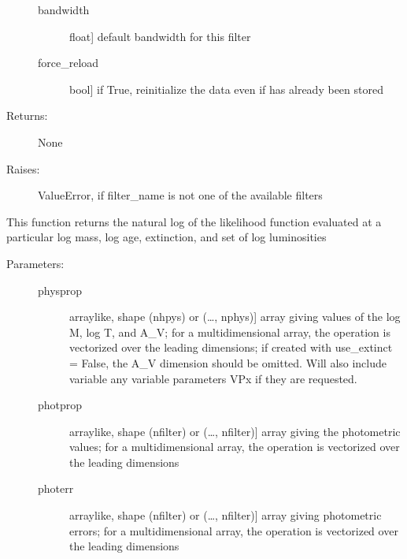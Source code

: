 \documentclass[letterpaper,10pt,english]{sphinxmanual}
\begin{document}
\begin{fulllineitems}
\begin{fulllineitems}
\begin{description}
\begin{description}
\item[{bandwidth}] \leavevmode{[}float{]}
default bandwidth for this filter

\item[{force\_reload}] \leavevmode{[}bool{]}
if True, reinitialize the data even if has already been
stored

\end{description}

\item[{Returns:}] \leavevmode
None

\item[{Raises:}] \leavevmode
ValueError, if filter\_name is not one of the available
filters

\end{description}

\end{fulllineitems}


\begin{fulllineitems}
\label{\detokenize{cluster_slug:slugpy.cluster_slug.cluster_slug.logL}}
This function returns the natural log of the likelihood
function evaluated at a particular log mass, log age,
extinction, and set of log luminosities
\begin{description}
\item[{Parameters:}] \leavevmode\begin{description}
\item[{physprop}] \leavevmode{[}arraylike, shape (nhpys) or (…, nphys){]}
array giving values of the log M, log T, and A\_V; for a
multidimensional array, the operation is vectorized over
the leading dimensions; if created with use\_extinct =
False, the A\_V dimension should be omitted.
Will also include variable any variable parameters VPx if
they are requested.

\item[{photprop}] \leavevmode{[}arraylike, shape (nfilter) or (…, nfilter){]}
array giving the photometric values; for a
multidimensional array, the operation is vectorized over
the leading dimensions

\item[{photerr}] \leavevmode{[}arraylike, shape (nfilter) or (…, nfilter){]}
array giving photometric errors; for a multidimensional
array, the operation is vectorized over the leading
dimensions


\end{description}
\end{description}
\end{fulllineitems}
\end{fulllineitems}
\end{document}
